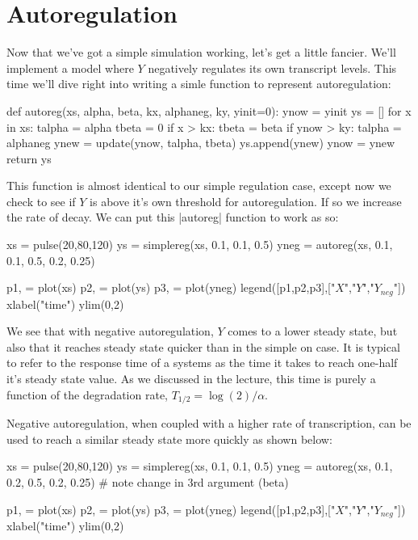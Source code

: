 \section{Autoregulation}

Now that we've got a simple simulation working, let's get a little fancier. We'll implement a model where $Y$ negatively regulates its own transcript levels. This time we'll dive right into writing a simle function to represent   autoregulation:
%
\begin{python}
def autoreg(xs, alpha, beta, kx, alphaneg, ky, yinit=0):
    ynow = yinit
    ys = []
    for x in xs:
        talpha = alpha
        tbeta = 0
        if x > kx:
            tbeta = beta
        if ynow > ky:
            talpha = alphaneg
        ynew = update(ynow, talpha, tbeta)
        ys.append(ynew)
        ynow = ynew
    return ys
\end{python}
%
This function is almost identical to our simple regulation case, except now we check to see if $Y$ is above it's own threshold for autoregulation. If so we increase the rate of decay. We can put this |autoreg| function to work as so:
%
\begin{python}
xs = pulse(20,80,120)
ys = simplereg(xs, 0.1, 0.1, 0.5)
yneg = autoreg(xs, 0.1, 0.1, 0.5, 0.2, 0.25)

p1, = plot(xs)
p2, = plot(ys)
p3, = plot(yneg)
legend([p1,p2,p3],["$X$","$Y$","$Y_{neg}$"])
xlabel("time")
ylim(0,2)
\end{python}

We see that with negative autoregulation, $Y$ comes to a lower steady state, but also that it reaches steady state quicker than in the simple on case. It is typical to refer to the response time of a systems as the time it takes to reach one-half it's steady state value.  As we discussed in the lecture, this time is purely a function of the degradation rate, $T_{1/2} = \log(2)/\alpha$.

Negative autoregulation, when coupled with a higher rate of transcription, can be used to reach a similar steady state more quickly as shown below:
%
\begin{python}
xs = pulse(20,80,120)
ys = simplereg(xs, 0.1, 0.1, 0.5)
yneg = autoreg(xs, 0.1, 0.2, 0.5, 0.2, 0.25) # note change in 3rd argument (beta)

p1, = plot(xs)
p2, = plot(ys)
p3, = plot(yneg)
legend([p1,p2,p3],["$X$","$Y$","$Y_{neg}$"])
xlabel("time")
ylim(0,2)
\end{python}

